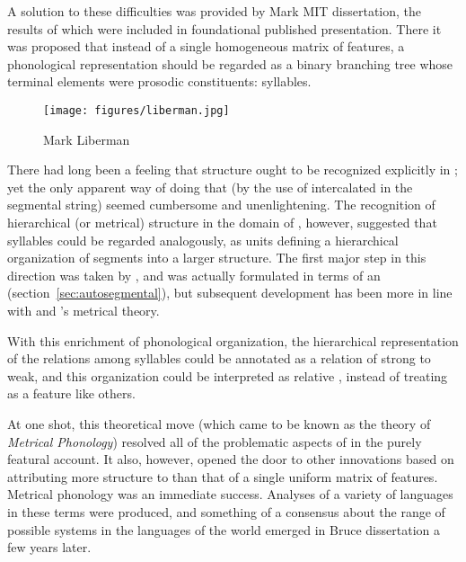A solution to these difficulties was provided by Mark
 MIT dissertation, the results of which
were included in  foundational
published presentation. There it was proposed that instead of a single
homogeneous matrix of features, a phonological representation should
be regarded as a binary branching tree whose terminal elements were
prosodic constituents: syllables.

\begin{wrapfigure}{l}{.35\textwidth}
  \texttt{[image: figures/liberman.jpg]}
  \caption{Mark Liberman}
  \label{fig:ch.otlabphon.liberman}
\end{wrapfigure}
There had long been a feeling that  structure ought to be
recognized explicitly in ; yet the only
apparent way of doing that (by the use of intercalated 
 in the segmental string) seemed cumbersome and
unenlightening. The recognition of hierarchical (or metrical)
structure in the domain of , however, suggested that syllables
could be regarded analogously, as units defining a hierarchical
organization of segments into a larger structure. The first major step
in this direction was taken by \citet{kahn:thesis}, and was actually
formulated in terms of an 
(section~\ref{sec:autosegmental}), but subsequent development has been
more in line with {\Liberman} and {\Prince}'s metrical theory.

With this enrichment of phonological organization, the hierarchical
representation of the relations among syllables could be annotated as
a relation of strong to weak, and this organization could be
interpreted as relative , instead of treating  as a
feature like others.

At one shot, this theoretical move (which came to be known as the
theory of \emph{Metrical Phonology}) resolved all of the problematic aspects
of  in the purely featural account. It also, however, opened the
door to other innovations based on attributing more structure to
 than that of a single uniform matrix of
features.  Metrical phonology was an immediate success.  Analyses of a
variety of languages in these terms were produced, and something of a
consensus about the range of possible  systems in the languages
of the world emerged in Bruce  dissertation a
few years later.

